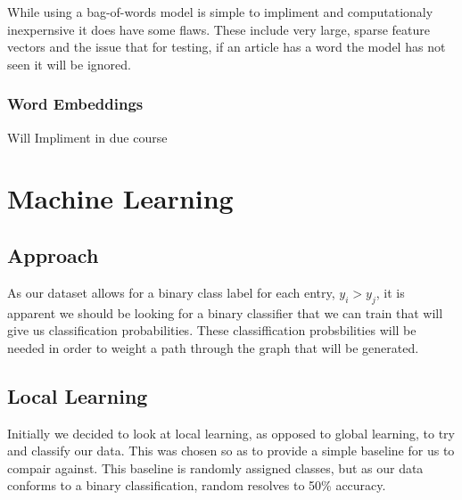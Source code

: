 \documentclass[12pt]{report}
\begin{document}
                While using a bag-of-words model is simple to impliment and computationaly inexpernsive
                it does have some flaws. These include very large, sparse feature vectors and the issue
                that for testing, if an article has a word the model has not seen it will be ignored.
                  
                
                
                \subsection{Word Embeddings}
                Will Impliment in due course

\chapter{Machine Learning}

\section{Approach}
As our dataset allows for a binary class label for each entry,
$y_{i} > y_{j}$, it is apparent we should be looking for a binary classifier that we can train
that will give us classification probabilities. These classiffication probsbilities
will be needed in order to weight a path through the graph that will be generated.
\section{Local Learning}
Initially we decided to look at local learning, as opposed to global learning,
to try and classify our data. This was chosen so as to provide a
simple baseline for us to compair against. This baseline is
randomly assigned classes, but as our data conforms to a
binary classification, random resolves to 50\% accuracy.
\end{document}
